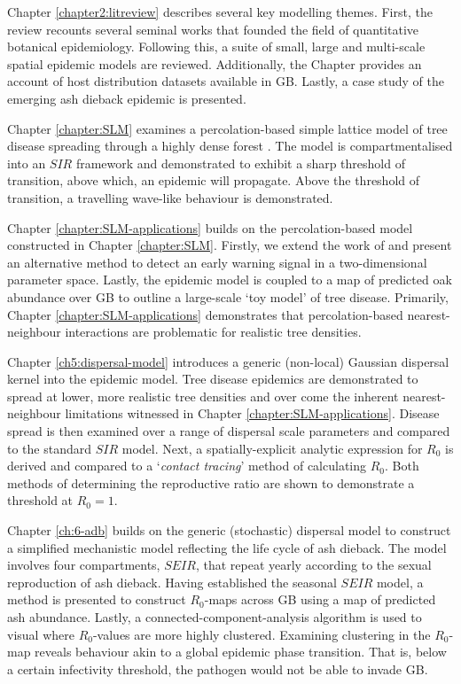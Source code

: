 Chapter \ref{chapter2:litreview} describes several key modelling themes. First, the review recounts
several seminal works that founded the field of quantitative botanical epidemiology. Following this,
a suite of small, large and multi-scale spatial epidemic models are reviewed. Additionally,
the Chapter provides an account of host distribution datasets available in GB. Lastly, a case study of the emerging
ash dieback epidemic is presented.

Chapter \ref{chapter:SLM} examines a percolation-based simple lattice model of tree disease spreading through a highly
dense forest \cite{OROZCOFUENTES201912}. The model is compartmentalised into an $SIR$ framework and 
demonstrated to exhibit a sharp threshold of transition, above which, an epidemic will propagate. 
Above the threshold of transition, a travelling wave-like behaviour is demonstrated.

Chapter \ref{chapter:SLM-applications} builds on the percolation-based model constructed in Chapter \ref{chapter:SLM}.
Firstly, we extend the work of \cite{OROZCOFUENTES201912} and present an alternative method to detect an early 
warning signal in a two-dimensional parameter space. Lastly, the epidemic model is coupled to a map of 
predicted oak abundance over GB \cite{hill.data} to outline a large-scale `toy model' of tree disease. 
Primarily, Chapter \ref{chapter:SLM-applications} demonstrates that percolation-based nearest-neighbour interactions are
problematic for realistic tree densities. 

Chapter \ref{ch5:dispersal-model} introduces a generic (non-local) Gaussian dispersal kernel into the epidemic model. 
Tree disease epidemics are demonstrated to spread at lower, more realistic tree densities and over come the inherent 
nearest-neighbour limitations witnessed in Chapter \ref{chapter:SLM-applications}. 
Disease spread is then examined over a range of dispersal scale parameters and compared to the standard $SIR$ model.
Next, a spatially-explicit analytic expression for $R_0$ is derived and compared to a `\textit{contact tracing}' method of calculating $R_0$.
Both methods of determining the reproductive ratio are shown to demonstrate a threshold at $R_0=1$.

Chapter \ref{ch:6-adb} builds on the generic (stochastic) dispersal model to construct a simplified mechanistic model 
reflecting the life cycle of ash dieback. The model involves four compartments, $SEIR$, that repeat yearly according to 
the sexual reproduction of ash dieback. Having established the seasonal $SEIR$ model, a method is presented to 
construct $R_0$-maps across GB using a map of predicted ash abundance. Lastly, a connected-component-analysis algorithm is used
to visual where $R_0$-values are more highly clustered. Examining clustering in the $R_0$-map reveals behaviour
akin to a global epidemic phase transition. That is, below a certain infectivity threshold, the pathogen would not be able to invade GB.

